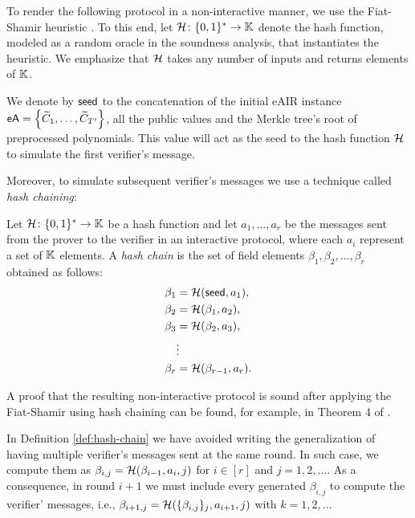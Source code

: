 \ifNOPOLYGON
To render the following protocol in a non-interactive manner, we use the Fiat-Shamir heuristic \cite{C:FiaSha86}. To this end, let $\mathcal{H} \colon \{0,1\}^* \to \mathbb{K}$ denote the hash function, modeled as a random oracle in the soundness analysis, that instantiates the heuristic. We emphasize that $\mathcal{H}$ takes any number of inputs and returns elements of $\mathbb{K}$.
\fi

We denote by $\textsf{seed}$ to the concatenation of the initial eAIR instance $\textsf{eA} = \left\{\widetilde{C}_1,\dots,\widetilde{C}_{T'}\right\}$, all the public values and the Merkle tree's root of preprocessed polynomials. This value will act as the seed to the hash function $\mathcal{H}$ to simulate the first verifier's message. 

\ifNOPOLYGON
Moreover, to simulate subsequent verifier's messages we use a technique called \textit{hash chaining}:
\begin{definition}\label{def:hash-chain}
  Let $\mathcal{H} \colon \{0,1\}^* \to \mathbb{K}$ be a hash function and let $a_1,\dots,a_r$ be the messages sent from the prover to the verifier in an interactive protocol, where each $a_i$ represent a set of $\mathbb{K}$ elements.
  A \textit{hash chain} is the set of field elements $\beta_1,\beta_2,\dots,\beta_r$ obtained as follows:
  \begin{align*}
    \beta_1 &= \mathcal{H}(\textsf{seed}, a_1), \\
    \beta_2 &= \mathcal{H}(\beta_1, a_2), \\
    \beta_3 &= \mathcal{H}(\beta_2, a_3), \\
    &\vdots \\
    \beta_r &= \mathcal{H}(\beta_{r-1}, a_r).
  \end{align*}
\end{definition}
A proof that the resulting non-interactive protocol is sound after applying the Fiat-Shamir using hash chaining can be found, for example, in Theorem 4 of \cite{EPRINT:AttFehKlo21}.

\begin{remark}
  In Definition \ref{def:hash-chain} we have avoided writing the generalization of having multiple verifier's messages sent at the same round. In such case, we compute them as $\beta_{i,j} = \mathcal{H}(\beta_{i-1},a_i,j)$ for $i \in [r]$ and $j = 1,2,\dots$. As a consequence, in round $i+1$ we must include every generated $\beta_{i,j}$ to compute the verifier' messages, i.e.,  $\beta_{i+1,j} = \mathcal{H}(\{\beta_{i,j}\}_j,a_{i+1},j)$ with $k = 1,2,\dots$
\end{remark}
\fi

